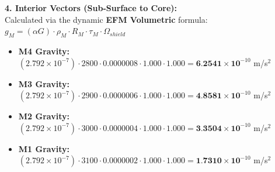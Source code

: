 \documentclass[11pt, a4paper]{article}
\begin{document}
  \vspace{0.5em}
  \noindent \textbf{4. Interior Vectors (Sub-Surface to Core):} \\[0.5em]
  \hspace*{1em} Calculated via the dynamic \textbf{EFM Volumetric} formula: $g_M = (\alpha G) \cdot \rho_{M} \cdot R_M \cdot \tau_M \cdot \Omega_{shield}$
  \begin{itemize}
    \item \textbf{M4 Gravity:} $(2.792 \times 10^{-7}) \cdot 2800 \cdot 0.0000008 \cdot 1.000 \cdot 1.000 = \textbf{6.2541} \times \textbf{10}^{-10}$ m/s$^2$
    \item \textbf{M3 Gravity:} $(2.792 \times 10^{-7}) \cdot 2900 \cdot 0.0000006 \cdot 1.000 \cdot 1.000 = \textbf{4.8581} \times \textbf{10}^{-10}$ m/s$^2$
    \item \textbf{M2 Gravity:} $(2.792 \times 10^{-7}) \cdot 3000 \cdot 0.0000004 \cdot 1.000 \cdot 1.000 = \textbf{3.3504} \times \textbf{10}^{-10}$ m/s$^2$
    \item \textbf{M1 Gravity:} $(2.792 \times 10^{-7}) \cdot 3100 \cdot 0.0000002 \cdot 1.000 \cdot 1.000 = \textbf{1.7310} \times \textbf{10}^{-10}$ m/s$^2$
  \end{itemize}
\end{document}

